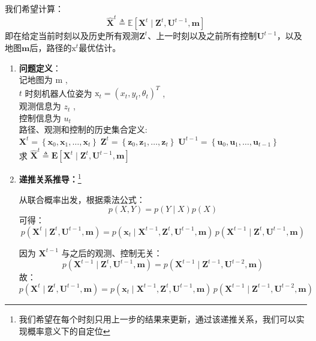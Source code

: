 \documentclass[../main.tex]{subfiles}
\begin{document}
\begin{enumerate}
            我们希望计算：
        \[
        \widehat{\mathbf{X}}^{t} \triangleq \mathbb{E}\left[ \mathbf{X}^{t} \mid \mathbf{Z}^{t}, \mathbf{U}^{t-1}, \mathbf{m} \right]
        \]
        即在给定当前时刻以及历史所有观测$\mathbf{Z}^{t}$、上一时刻以及之前所有控制$\mathbf{U}^{t-1}$，以及地图$\mathbf{m}$后，路径的$\mathrm{x}^t$最优估计。
        {\small\kaishu 
        \begin{enumerate}
        \item \textbf{问题定义}：\\
        记地图为 \( \mathrm{m} \) ,\\
\( t \) 时刻机器人位姿为 \( \mathrm{x}_{t} = {\left( {x}_{t},{y}_{t},{\theta }_{t}\right) }^{T} \) ,\\观测信息为 \( {z}_{t} \) ,\\控制信息为 \( {u}_{t} \)\\路径、观测和控制的历史集合定义:
\( {\mathbf{X}}^{t} = \left\{  {{\mathbf{x}}_{0},{\mathbf{x}}_{1},\ldots ,{\mathbf{x}}_{t}}\right\}  \;{\mathbf{Z}}^{t} = \left\{  {{\mathbf{z}}_{0},{\mathbf{z}}_{1},\ldots ,{\mathbf{z}}_{t}}\right\}  \;{\mathbf{U}}^{t - 1} = \left\{  {{\mathbf{u}}_{0},{\mathbf{u}}_{1},\ldots ,{\mathbf{u}}_{t - 1}}\right\} \)
\\求 \( {\widehat{\mathbf{X}}}^{t} \triangleq  \mathbf{E}\left\lbrack  {{\mathbf{X}}^{t} \mid  {\mathbf{Z}}^{t},{\mathbf{U}}^{t - 1},\mathbf{m}}\right\rbrack \)
        \item \textbf{递推关系推导：}\footnote{我们希望在每个时刻只用上一步的结果来更新，通过该递推关系，我们可以实现概率意义下的自定位}
        
        从联合概率出发，根据乘法公式：
        \[
        p(X,Y) = p(Y \mid X) p(X)
        \]
        可得：
        \[
        p(\mathbf{X}^{t} \mid \mathbf{Z}^{t}, \mathbf{U}^{t-1}, \mathbf{m})
        = p(\mathbf{x}_t \mid \mathbf{X}^{t-1}, \mathbf{Z}^{t}, \mathbf{U}^{t-1}, \mathbf{m})
        \, p(\mathbf{X}^{t-1} \mid \mathbf{Z}^{t}, \mathbf{U}^{t-1}, \mathbf{m})
        \]

        因为 \( \mathbf{X}^{t-1} \) 与之后的观测、控制无关：
        \[
        p(\mathbf{X}^{t-1} \mid \mathbf{Z}^{t}, \mathbf{U}^{t-1}, \mathbf{m})
        = p(\mathbf{X}^{t-1} \mid \mathbf{Z}^{t-1}, \mathbf{U}^{t-2}, \mathbf{m})
        \]
        故：
        \[
        p(\mathbf{X}^{t} \mid \mathbf{Z}^{t}, \mathbf{U}^{t-1}, \mathbf{m})
        = p(\mathbf{x}_t \mid \mathbf{X}^{t-1}, \mathbf{Z}^{t}, \mathbf{U}^{t-1}, \mathbf{m})
        \, p(\mathbf{X}^{t-1} \mid \mathbf{Z}^{t-1}, \mathbf{U}^{t-2}, \mathbf{m})
        \]
        

\end{enumerate}}
\end{enumerate}
\end{document}
